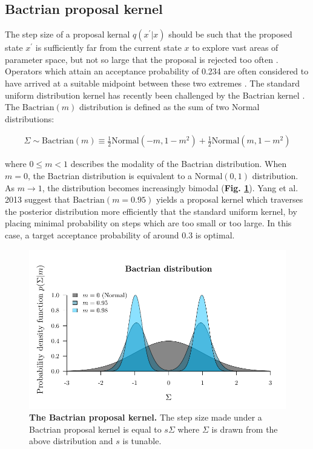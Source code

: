 \documentclass[10pt,letterpaper]{article}
\begin{document}
\clearpage
\subsection*{Bactrian proposal kernel} \label{sect:randomwalks}



The step size of a proposal kernal $q(x^\prime|x)$ should be such that the proposed state $x^\prime$ is sufficiently far from the current state $x$ to explore vast areas of parameter space, but not so large that the proposal is rejected too often \cite{roberts1997weak}. 
Operators which attain an acceptance probability of 0.234 are often considered to have arrived at a suitable midpoint between these two extremes \cite{bouckaert2019beast, roberts1997weak}.
The standard uniform distribution kernel has recently been challenged by the Bactrian kernel \cite{yang2013searching, thawornwattana2018designing}.
The $\text{Bactrian}(m)$ distribution is defined as the sum of two Normal distributions:


\begin{align}
	\Sigma \sim \text{Bactrian}(m) \equiv \frac{1}{2}\text{Normal}(-m, 1-m^2) + \frac{1}{2}\text{Normal}(m, 1-m^2)
\end{align}


where $0 \leq m < 1$ describes the modality of the Bactrian distribution. When $m=0$, the Bactrian distribution is equivalent to a $\text{Normal}(0, 1)$ distribution. As $m \rightarrow 1$, the distribution becomes increasingly bimodal (\textbf{Fig. \ref{fig:bactrian}}). 
Yang et al. 2013 \cite{yang2013searching} suggest that $\text{Bactrian}(m=0.95)$ yields a proposal kernel which traverses the posterior distribution more efficiently that the standard uniform kernel, by placing minimal probability on steps which are too small or too large.
In this case, a target acceptance probability of around 0.3 is optimal.


\begin{figure}[!h]
\includegraphics[width=\textwidth]{Figures/bactrian.pdf}
\caption{\textbf{The Bactrian proposal kernel.} The step size made under a Bactrian proposal kernel is equal to $s \Sigma$ where $\Sigma$ is drawn from the above distribution and $s$ is tunable.   }
\label{fig:bactrian}
\end{figure}
\end{document}
